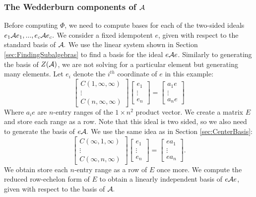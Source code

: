 \documentclass[../thesis.tex]{subfiles}
\begin{document}
\subsubsection{The Wedderburn components of $\mathcal{A}$}\label{sec:wedderburncomponents}
Before computing $\Phi$, we need to compute bases for each of the two-sided ideals $e_1\mathcal{A} e_1,...,e_c\mathcal{A} e_c.$ We consider a fixed idempotent $e$, given with respect to the standard basis of $\mathcal{A}.$ We use the linear system shown in Section \ref{sec:FindingSubalgebras} to find a basis for the ideal $e\mathcal{A} e$. Similarly to generating the basis of $Z(\mathcal{A})$, we are not solving for a particular element but generating many elements. Let $e_i$ denote the $i^{th}$ coordinate of $e$ in this example:
\begin{equation*}
    \begin{bmatrix}
        C(1,\infty,\infty)\\
        \vdots\\
        C(n,\infty,\infty)
    \end{bmatrix}
    \begin{bmatrix}
        e_1\\\vdots\\e_n
    \end{bmatrix}
    = 
    \begin{bmatrix}
        a_1e\\\vdots\\ a_ne
    \end{bmatrix}
\end{equation*}
Where $a_ie$ are $n$-entry ranges of the $1\times n^2$ product vector. We create a matrix $E$ and store each range as a row.
Note that this ideal is two sided, so we also need to generate the basis of $e\mathcal{A}.$ We use the same idea as in Section \ref{sec:CenterBasis}:
\begin{equation*}
    \begin{bmatrix}
        C(\infty,1,\infty)\\
        \vdots\\
        C(\infty,n,\infty)
    \end{bmatrix}
    \begin{bmatrix}
        e_1\\\vdots\\e_n
    \end{bmatrix}
    = 
    \begin{bmatrix}
        ea_1\\\vdots\\ ea_n
    \end{bmatrix}.
\end{equation*}
We obtain store each $n$-entry range as a row of $E$ once more. We compute the reduced row-echelon form of $E$ to obtain a linearly independent basis of $e\mathcal{A} e$, given with respect to the basis of $\mathcal{A}.$
\end{document}
